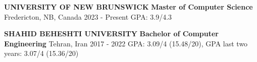 \begin{cventries}
    \cventry
    {\textbf {UNIVERSITY OF NEW BRUNSWICK}}
    {\textbf {Master of Computer Science}}
    {Fredericton, NB, Canada}
    {2023 - Present}
    {GPA: 3.9/4.3}
    
    \vspace{0.4 cm}

    \cventry
    {\textbf {SHAHID BEHESHTI UNIVERSITY}}
    {\textbf {Bachelor of Computer Engineering}}
    {Tehran, Iran}
    {2017 - 2022}
    {GPA: 3.09/4 (15.48/20), GPA last two years: 3.07/4 (15.36/20)}
    
\end{cventries}